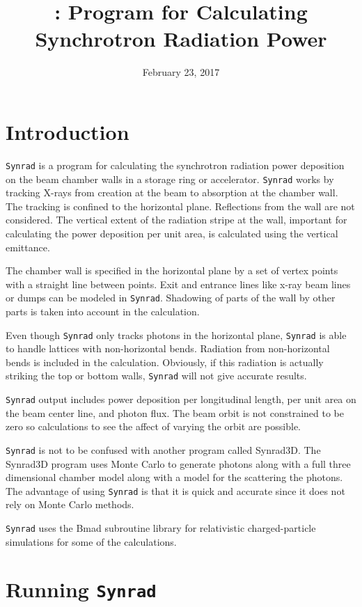 \documentclass[11pt]{article}
\title{\syn: Program for Calculating Synchrotron Radiation Power}
\author{}
\date{February 23, 2017}
\newcommand{\syn}{\texttt{Synrad}\xspace}
\begin{document}
\maketitle

\section{Introduction} 

\syn is a program for calculating the synchrotron radiation power
deposition on the beam chamber walls in a storage ring or
accelerator. \syn works by tracking X-rays from creation at the
beam to absorption at the chamber wall. The tracking is confined to
the horizontal plane. Reflections from the wall are not considered.
The vertical extent of the radiation stripe at the wall, important for
calculating the power deposition per unit area, is calculated using
the vertical emittance.

The chamber wall is specified in the horizontal plane by a set of
vertex points with a straight line between points. Exit and entrance
lines like x-ray beam lines or dumps can be modeled in \syn.
Shadowing of parts of the wall by other parts is taken into account in
the calculation.

Even though \syn only tracks photons in the horizontal plane, \syn
is able to handle lattices with non-horizontal bends. Radiation from
non-horizontal bends is included in the calculation. Obviously, if
this radiation is actually striking the top or bottom walls, \syn
will not give accurate results.

\syn output includes power deposition per longitudinal length, per
unit area on the beam center line, and photon flux. The beam orbit is
not constrained to be zero so calculations to see the affect of
varying the orbit are possible.

\syn is not to be confused with another program called Synrad3D.
The Synrad3D program uses Monte Carlo to generate photons along with a
full three dimensional chamber model along with a model for the
scattering the photons. The advantage of using \syn is that it is
quick and accurate since it does not rely on Monte Carlo methods.

\syn uses the Bmad subroutine library for relativistic
charged-particle simulations\cite{b:bmad} for some of the
calculations. 

\section{Running \syn}
\label{s:run}
\end{document}

